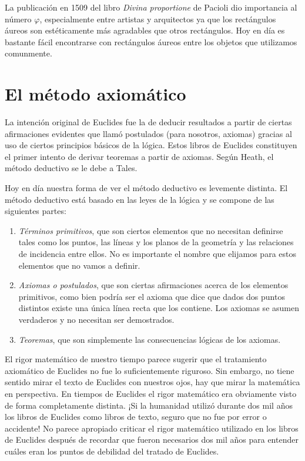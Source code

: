 La publicación
en 1509 del libro \emph{Divina proportione} de Pacioli dio 
importancia al número $\varphi$,
especialmente entre artistas y arquitectos ya que los
rectángulos áureos son estéticamente más agradables que otros rectángulos. Hoy
en día es bastante fácil encontrarse con rectángulos áureos entre los objetos
que utilizamos comunmente. 

\section*{El método axiomático}

La intención original de Euclides fue la de deducir resultados a partir de
ciertas afirmaciones evidentes que llamó postulados (para nosotros, axiomas)
gracias al uso de ciertos principios básicos de la lógica. Estos libros de
Euclides constituyen el primer intento de derivar teoremas a partir de axiomas.
Según Heath, el método deductivo se le debe a Tales. 

Hoy en día nuestra forma de ver el método deductivo es levemente distinta.  El
método deductivo está basado en las leyes de la lógica y se compone de las
siguientes partes:
\begin{enumerate} 
	\item \emph{Términos primitivos}, que son ciertos elementos que no necesitan
			definirse tales como los puntos, las líneas y los planos de la
			geometría y las relaciones de incidencia entre ellos. No es
			importante el nombre que elijamos para estos elementos que no vamos
			a definir. 
		\item \emph{Axiomas o postulados}, que son ciertas afirmaciones acerca
			de los elementos primitivos, como bien podría ser el axioma que
			dice que dados dos puntos distintos existe una única línea recta
			que los contiene. Los axiomas se asumen verdaderos y no necesitan
			ser demostrados. 
		\item \emph{Teoremas}, que son simplemente las consecuencias lógicas de
			los axiomas.
\end{enumerate}

El rigor matemático de nuestro tiempo parece sugerir que el tratamiento
axiomático de Euclides no fue lo suficientemente riguroso. Sin embargo, no
tiene sentido mirar el texto de Euclides con nuestros ojos, hay que mirar la
matemática en perspectiva. En tiempos de Euclides el rigor matemático era
obviamente visto de forma completamente distinta. ¡Si la humanidad utilizó
durante dos mil años los libros de Euclides como libros de texto, seguro que no
fue por error o accidente! No parece apropiado criticar el rigor matemático
utilizado en los libros de Euclides después de recordar que fueron necesarios
dos mil años para entender cuáles eran los puntos de debilidad del tratado de
Euclides.

